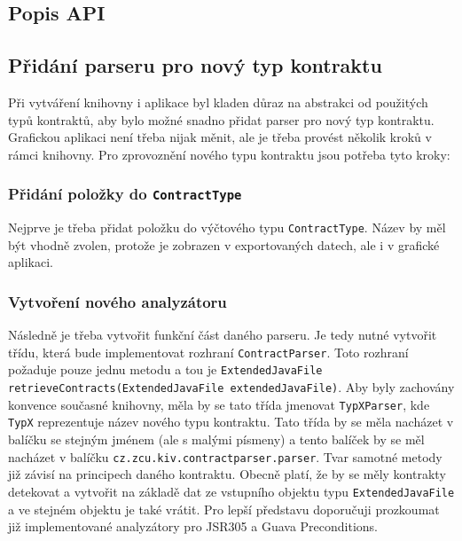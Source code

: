 	    \subsection{Popis API}
	    
	    
	    \subsection{Přidání parseru pro nový typ kontraktu}
	    	Při vytváření knihovny i aplikace byl kladen důraz na abstrakci od použitých typů kontraktů, aby bylo možné snadno přidat parser pro nový typ kontraktu. Grafickou aplikaci není třeba nijak měnit, ale je třeba provést několik kroků v rámci knihovny. Pro zprovoznění nového typu kontraktu jsou potřeba tyto kroky:
	    	
	    	\subsubsection{Přidání položky do \texttt{ContractType}}
	    		Nejprve je třeba přidat položku do výčtového typu \texttt{ContractType}. Název by měl být vhodně zvolen, protože je zobrazen v exportovaných datech, ale i v grafické aplikaci.
	    		
	    	\subsubsection{Vytvoření nového analyzátoru}
	    		Následně je třeba vytvořit funkční část daného parseru. Je tedy nutné vytvořit třídu, která bude implementovat rozhraní \texttt{ContractParser}. Toto rozhraní požaduje pouze jednu metodu a tou je \texttt{ExtendedJavaFile retrieveContracts(ExtendedJavaFile extendedJavaFile)}. Aby byly zachovány konvence současné knihovny, měla by se tato třída jmenovat \texttt{TypXParser}, kde \texttt{TypX} reprezentuje název nového typu kontraktu. Tato třída by se měla nacházet v balíčku se stejným jménem (ale s malými písmeny) a tento balíček by se měl nacházet v balíčku \texttt{cz.zcu.kiv.contractparser.parser}. Tvar samotné metody již závisí na principech daného kontraktu. Obecně platí, že by se měly kontrakty detekovat a vytvořit na základě dat ze vstupního objektu typu \texttt{ExtendedJavaFile} a ve stejném objektu je také vrátit. Pro lepší představu doporučuji prozkoumat již implementované analyzátory pro JSR305 a Guava Preconditions.
	    		
